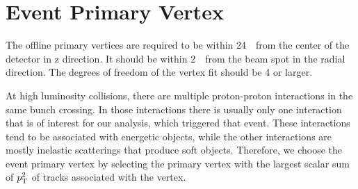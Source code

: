 %

\section{ Event Primary Vertex }

The offline primary vertices are required to be within 24~\cm\ from the center of the 
detector 
in z direction. 
It should be within 2~\cm\ from the beam spot in the radial direction. 
The degrees of freedom of the vertex fit should be 4 or larger. 

At high luminosity collisions, there are multiple proton-proton interactions 
in the same bunch crossing. In those interactions there is usually 
only one interaction that is of interest for our analysis, which triggered that event. 
These interactions tend to be associated with energetic objects, 
while the other interactions are mostly inelastic scatterings that produce soft objects.
Therefore, we choose the event primary vertex by selecting the primary vertex 
with the largest scalar sum of $p_\mathrm{T}^2$ of tracks associated with the vertex. 



